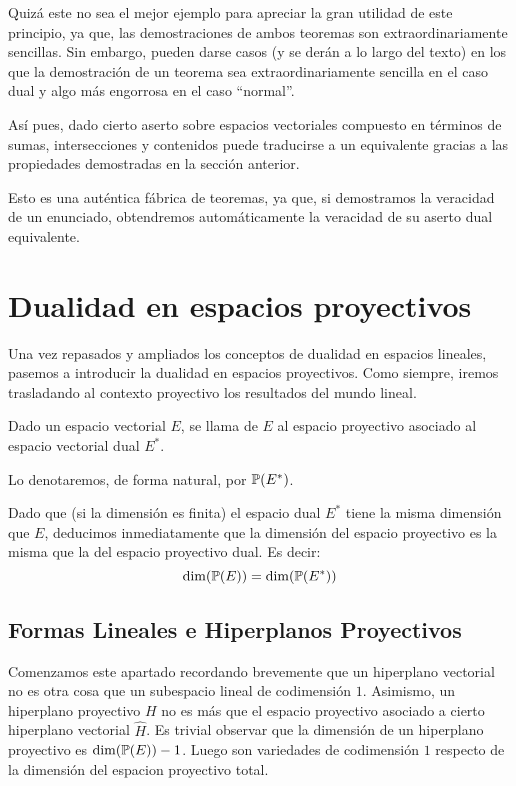 Quizá este no sea el mejor ejemplo para apreciar la gran utilidad de este principio, ya que, las demostraciones de ambos teoremas son extraordinariamente sencillas. Sin embargo, pueden darse casos (y se derán a lo largo del texto) en los que la demostración de un teorema sea extraordinariamente sencilla en el caso dual y algo más engorrosa en el caso ``normal''.

Así pues, dado cierto aserto sobre espacios vectoriales compuesto en términos de sumas, intersecciones y contenidos puede traducirse a un  equivalente gracias a las propiedades demostradas en la sección anterior.

Esto es una auténtica fábrica de teoremas, ya que, si demostramos la veracidad de un enunciado, obtendremos automáticamente la veracidad de su aserto dual equivalente. 
\section{Dualidad en espacios proyectivos}
Una vez repasados y ampliados los conceptos de dualidad en espacios lineales, pasemos a introducir la dualidad en espacios proyectivos. Como siempre, iremos trasladando al contexto proyectivo los resultados del mundo lineal.
\begin{defi}
	Dado un espacio vectorial $E$, se llama  de $E$ al espacio proyectivo asociado al espacio vectorial dual $E^*$.
	
	Lo denotaremos, de forma natural, por $\mathbb{P}(E^*)$.
\end{defi}
\begin{obs}
	Dado que (si la dimensión es finita) el espacio dual $E^*$ tiene la misma dimensión que $E$, deducimos inmediatamente que la dimensión del espacio proyectivo es la misma que la del espacio proyectivo dual. Es decir:
	\begin{equation}
	\dim(\mathbb{P}(E))=\dim (\mathbb{P}(E^*))
	\end{equation}
\end{obs}

\subsection{Formas Lineales e Hiperplanos Proyectivos}

Comenzamos este apartado recordando brevemente que un hiperplano vectorial no es otra cosa que un subespacio lineal de codimensión $1$. Asimismo, un hiperplano proyectivo $H$ no es más que el espacio proyectivo asociado a cierto hiperplano vectorial $\widehat{H}$. Es trivial observar que la dimensión de un hiperplano proyectivo es $\dim(\mathbb{P}(E))-1$. Luego son variedades de codimensión $1$ respecto de la dimensión del espacion proyectivo total.

